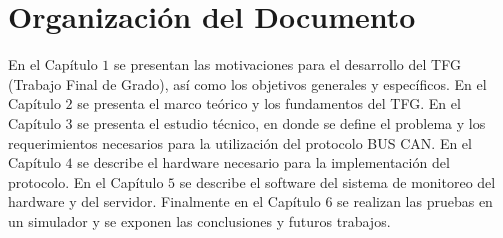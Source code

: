 \section{Organización del Documento}

En el Capítulo $1$ se presentan las motivaciones para el desarrollo del TFG (Trabajo Final de Grado), así como los objetivos generales y específicos. En el Capítulo $2$ se presenta el marco teórico y los fundamentos del TFG. En el Capítulo $3$ se presenta el estudio técnico, en donde se define el problema y los requerimientos necesarios para la utilización del protocolo BUS CAN. En el Capítulo $4$ se describe el hardware necesario para la implementación del protocolo. En el Capítulo $5$  se describe el software del sistema de monitoreo del hardware y del servidor. Finalmente en el Capítulo $6$ se realizan las pruebas en un simulador y se exponen las conclusiones y futuros trabajos.




